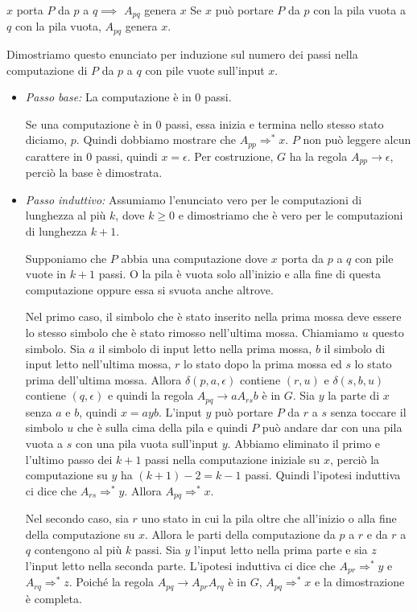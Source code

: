 \begin{Lemma}{$x$ porta $P$ da $p$ a $q\implies$ $A_{pq}$ genera $x$}{}
Se $x$ può portare $P$ da $p$ con la pila vuota a $q$ con la pila vuota, $A_{pq}$ genera $x$.

Dimostriamo questo enunciato per induzione sul numero dei passi nella computazione di $P$ da $p$ a $q$ con pile vuote sull'input $x$.
\begin{itemize}
    \item \textit{Passo base:} La computazione è in 0 passi.

    Se una computazione è in 0 passi, essa inizia e termina nello stesso stato diciamo, $p$. Quindi dobbiamo mostrare che $A_{pp}\Rightarrow^* x$. $P$ non può leggere alcun carattere in 0 passi, quindi $x =\epsilon$. Per costruzione, $G$ ha la regola $A_{pp}\to\epsilon$, perciò la base è dimostrata.
    \item \textit{Passo induttivo:} Assumiamo l'enunciato vero per le computazioni di lunghezza al più $k$, dove $k\geq 0$ e dimostriamo che è vero per le computazioni di lunghezza $k + 1$.

    Supponiamo che $P$ abbia una computazione dove $x$ porta da $p$ a $q$ con pile vuote in $k + 1$ passi. O la pila è vuota solo all'inizio e alla fine di questa computazione oppure essa si svuota anche altrove.

    Nel primo caso, il simbolo che è stato inserito nella prima mossa deve essere lo stesso simbolo che è stato rimosso nell'ultima mossa. Chiamiamo $u$ questo simbolo. Sia $a$ il simbolo di input letto nella prima mossa, $b$ il simbolo di input letto nell'ultima mossa, $r$ lo stato dopo la prima mossa ed $s$ lo stato prima dell'ultima mossa. Allora $\delta(p, a, \epsilon)$ contiene $(r, u)$ e $\delta(s, b, u)$ contiene $(q, \epsilon)$ e quindi la regola $A_{pq}\to aA_{rs}b$ è in $G$. Sia $y$ la parte di $x$ senza $a$ e $b$, quindi $x = ayb$. L'input $y$ può portare $P$ da $r$ a $s$ senza toccare il simbolo $u$ che è sulla cima della pila e quindi $P$ può andare dar con una pila vuota a $s$ con una pila vuota sull'input $y$. Abbiamo eliminato il primo e l'ultimo passo dei $k + 1$ passi nella computazione iniziale su $x$, perciò la computazione su $y$ ha $(k + 1) - 2 = k - 1$ passi. Quindi l'ipotesi induttiva ci dice che $A_{rs}\Rightarrow^* y$. Allora $A_{pq}\Rightarrow^* x$.

    Nel secondo caso, sia $r$ uno stato in cui la pila oltre che all'inizio o alla fine della computazione su $x$. Allora le parti della computazione da $p$ a $r$ e da $r$ a $q$ contengono al più $k$ passi. Sia $y$ l'input letto nella prima parte e sia $z$ l'input letto nella seconda parte. L'ipotesi induttiva ci dice che $A_{pr}\Rightarrow^* y$ e $A_{rq}\Rightarrow^* z$. Poiché la regola $A_{pq}\to A_{pr}A_{rq}$ è in $G$, $A_{pq}\Rightarrow^* x$ e la dimostrazione è completa.
\end{itemize}
\end{Lemma}

